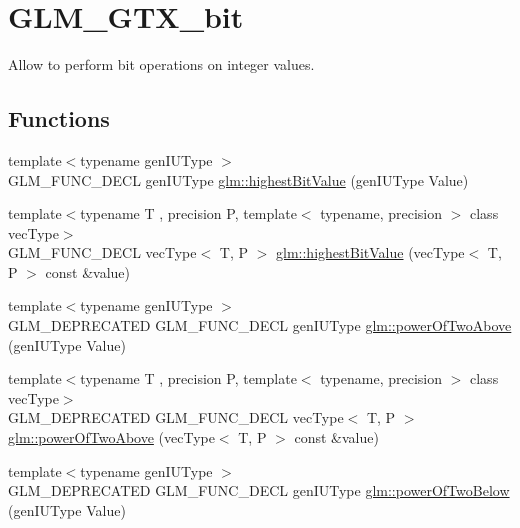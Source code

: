 \hypertarget{group__gtx__bit}{}\section{G\+L\+M\+\_\+\+G\+T\+X\+\_\+bit}
\label{group__gtx__bit}


Allow to perform bit operations on integer values.  


\subsection*{Functions}
\begin{DoxyCompactItemize}
\item 
{\footnotesize template$<$typename gen\+I\+U\+Type $>$ }\\G\+L\+M\+\_\+\+F\+U\+N\+C\+\_\+\+D\+E\+C\+L gen\+I\+U\+Type \hyperlink{group__gtx__bit_ga0dcc8fe7c3d3ad60dea409281efa3d05}{glm\+::highest\+Bit\+Value} (gen\+I\+U\+Type Value)
\item 
{\footnotesize template$<$typename T , precision P, template$<$ typename, precision $>$ class vec\+Type$>$ }\\G\+L\+M\+\_\+\+F\+U\+N\+C\+\_\+\+D\+E\+C\+L vec\+Type$<$ T, P $>$ \hyperlink{group__gtx__bit_ga5eea3a4d429040af13d39a7d7cd84d73}{glm\+::highest\+Bit\+Value} (vec\+Type$<$ T, P $>$ const \&value)
\item 
{\footnotesize template$<$typename gen\+I\+U\+Type $>$ }\\G\+L\+M\+\_\+\+D\+E\+P\+R\+E\+C\+A\+T\+E\+D G\+L\+M\+\_\+\+F\+U\+N\+C\+\_\+\+D\+E\+C\+L gen\+I\+U\+Type \hyperlink{group__gtx__bit_ga8cda2459871f574a0aecbe702ac93291}{glm\+::power\+Of\+Two\+Above} (gen\+I\+U\+Type Value)
\item 
{\footnotesize template$<$typename T , precision P, template$<$ typename, precision $>$ class vec\+Type$>$ }\\G\+L\+M\+\_\+\+D\+E\+P\+R\+E\+C\+A\+T\+E\+D G\+L\+M\+\_\+\+F\+U\+N\+C\+\_\+\+D\+E\+C\+L vec\+Type$<$ T, P $>$ \hyperlink{group__gtx__bit_gafe08808a50226b75b50e640a08b32ddc}{glm\+::power\+Of\+Two\+Above} (vec\+Type$<$ T, P $>$ const \&value)
\item 
{\footnotesize template$<$typename gen\+I\+U\+Type $>$ }\\G\+L\+M\+\_\+\+D\+E\+P\+R\+E\+C\+A\+T\+E\+D G\+L\+M\+\_\+\+F\+U\+N\+C\+\_\+\+D\+E\+C\+L gen\+I\+U\+Type \hyperlink{group__gtx__bit_ga3de7df63c589325101a2817a56f8e29d}{glm\+::power\+Of\+Two\+Below} (gen\+I\+U\+Type Value)

\end{DoxyCompactItemize}
